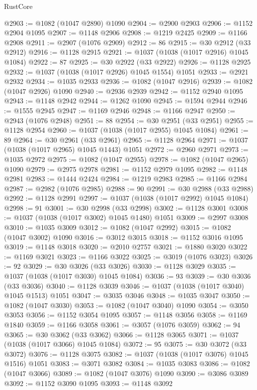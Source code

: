 \begin{lexlean}{RustCore}
\begin{coremodule}
@2903 := @1082 (@1047 @2890) @1090
@2904 := @2900 @2903
@2906 := @1152 @2904 @1095
@2907 := @1148 @2906
@2908 := @1219 @2425
@2909 := @1166 @2908
@2911 := @2907 (@1076 @2909)
@2912 := 86
@2915 := @30 @2912 (@33 @2912)
@2916 := @1128 @2915
@2921 := @1037 (@1038 (@1017 @2916) @1045 @1084)
@2922 := 87
@2925 := @30 @2922 (@33 @2922)
@2926 := @1128 @2925
@2932 := @1037 (@1038 (@1017 @2926) @1045 @1554) @1051
@2933 := @2921 @2932
@2934 := @1035 @2933
@2936 := @1082 (@1047 @2916)
@2939 := @1082 (@1047 @2926) @1090
@2940 := @2936 @2939
@2942 := @1152 @2940 @1095
@2943 := @1148 @2942
@2944 := @1262 @1090
@2945 := @1594 @2944
@2946 := @1555 @2945
@2947 := @1169 @2946
@2948 := @1166 @2947
@2950 := @2943 (@1076 @2948)
@2951 := 88
@2954 := @30 @2951 (@33 @2951)
@2955 := @1128 @2954
@2960 := @1037 (@1038 (@1017 @2955) @1045 @1084)
@2961 := 89
@2964 := @30 @2961 (@33 @2961)
@2965 := @1128 @2964
@2971 := @1037 (@1038 (@1017 @2965) @1045 @1443) @1051
@2972 := @2960 @2971
@2973 := @1035 @2972
@2975 := @1082 (@1047 @2955)
@2978 := @1082 (@1047 @2965) @1090
@2979 := @2975 @2978
@2981 := @1152 @2979 @1095
@2982 := @1148 @2981
@2983 := @1444 @2424
@2984 := @1219 @2983
@2985 := @1166 @2984
@2987 := @2982 (@1076 @2985)
@2988 := 90
@2991 := @30 @2988 (@33 @2988)
@2992 := @1128 @2991
@2997 := @1037 (@1038 (@1017 @2992) @1045 @1084)
@2998 := 91
@3001 := @30 @2998 (@33 @2998)
@3002 := @1128 @3001
@3008 := @1037 (@1038 (@1017 @3002) @1045 @1480) @1051
@3009 := @2997 @3008
@3010 := @1035 @3009
@3012 := @1082 (@1047 @2992)
@3015 := @1082 (@1047 @3002) @1090
@3016 := @3012 @3015
@3018 := @1152 @3016 @1095
@3019 := @1148 @3018
@3020 := @2010 @2757
@3021 := @1880 @3020
@3022 := @1169 @3021
@3023 := @1166 @3022
@3025 := @3019 (@1076 @3023)
@3026 := 92
@3029 := @30 @3026 (@33 @3026)
@3030 := @1128 @3029
@3035 := @1037 (@1038 (@1017 @3030) @1045 @1084)
@3036 := 93
@3039 := @30 @3036 (@33 @3036)
@3040 := @1128 @3039
@3046 := @1037 (@1038 (@1017 @3040) @1045 @1513) @1051
@3047 := @3035 @3046
@3048 := @1035 @3047
@3050 := @1082 (@1047 @3030)
@3053 := @1082 (@1047 @3040) @1090
@3054 := @3050 @3053
@3056 := @1152 @3054 @1095
@3057 := @1148 @3056
@3058 := @1169 @1840
@3059 := @1166 @3058
@3061 := @3057 (@1076 @3059)
@3062 := 94
@3065 := @30 @3062 (@33 @3062)
@3066 := @1128 @3065
@3071 := @1037 (@1038 (@1017 @3066) @1045 @1084)
@3072 := 95
@3075 := @30 @3072 (@33 @3072)
@3076 := @1128 @3075
@3082 := @1037 (@1038 (@1017 @3076) @1045 @1516) @1051
@3083 := @3071 @3082
@3084 := @1035 @3083
@3086 := @1082 (@1047 @3066)
@3089 := @1082 (@1047 @3076) @1090
@3090 := @3086 @3089
@3092 := @1152 @3090 @1095
@3093 := @1148 @3092

\end{coremodule}
\end{lexlean}
